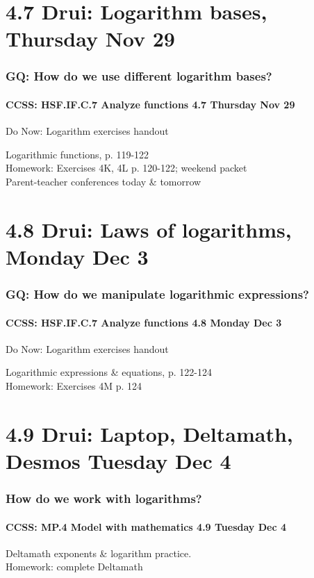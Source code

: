 \documentclass{beamer}
\begin{document}
  \section{4.7 Drui: Logarithm bases, Thursday Nov 29}
    \frame
    {
      \frametitle{GQ: How do we use different logarithm bases?}
      \framesubtitle{CCSS: HSF.IF.C.7 Analyze functions    \alert{4.7 Thursday Nov 29}}

      \begin{block}{Do Now: Logarithm exercises handout}
      \end{block}
      Logarithmic functions, p. 119-122\\ \bigskip
      Homework: Exercises 4K, 4L p. 120-122; weekend packet\\
      \alert{Parent-teacher conferences today \& tomorrow}
    }

  \section{4.8 Drui: Laws of logarithms, Monday Dec 3}
    \frame
    {
      \frametitle{GQ: How do we manipulate logarithmic expressions?}
      \framesubtitle{CCSS: HSF.IF.C.7 Analyze functions    \alert{4.8 Monday Dec 3}}

      \begin{block}{Do Now: Logarithm exercises handout}
      \end{block}
      Logarithmic expressions \& equations, p. 122-124\\ \bigskip
      Homework: Exercises 4M p. 124
    }

  \section{4.9 Drui: Laptop, Deltamath, Desmos Tuesday Dec 4}
    \frame
    {
      \frametitle{How do we work with logarithms?}
      \framesubtitle{CCSS: MP.4 Model with mathematics  \alert{4.9 Tuesday Dec 4}}

      Deltamath exponents \& logarithm practice.\\
      Homework: complete Deltamath\\
      }
\end{document}
